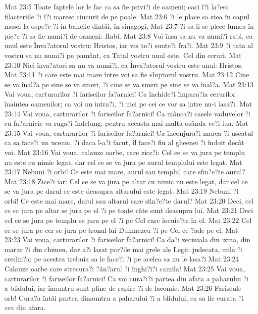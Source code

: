 Mat 23:5  Toate faptele lor le fac ca sa fie privi?i de oameni; caci î?i la?esc filacteriile ?i î?i maresc ciucurii de pe poale.
Mat 23:6  ?i le place sa stea în capul mesei la ospe?e ?i în bancile dintâi, în sinagogi,
Mat 23:7  ?i sa li se plece lumea în pie?e ?i sa fie numi?i de oameni: Rabi.
Mat 23:8  Voi însa sa nu va numi?i rabi, ca unul este Înva?atorul vostru: Hristos, iar voi to?i sunte?i fra?i.
Mat 23:9  ?i tata al vostru sa nu numi?i pe pamânt, ca Tatal vostru unul este, Cel din ceruri.
Mat 23:10  Nici înva?atori sa nu va numi?i, ca Înva?atorul vostru este unul: Hristos.
Mat 23:11  ?i care este mai mare între voi sa fie slujitorul vostru.
Mat 23:12  Cine se va înal?a pe sine se va smeri, ?i cine se va smeri pe sine se va înal?a.
Mat 23:13  Vai voua, carturarilor ?i fariseilor fa?arnici! Ca închide?i împara?ia cerurilor înaintea oamenilor; ca voi nu intra?i, ?i nici pe cei ce vor sa intre nu-i lasa?i.
Mat 23:14  Vai voua, carturarilor ?i fariseilor fa?arnici! Ca mânca?i casele vaduvelor ?i cu fa?arnicie va ruga?i îndelung; pentru aceasta mai multa osânda ve?i lua.
Mat 23:15  Vai voua, carturarilor ?i fariseilor fa?arnici! Ca înconjura?i marea ?i uscatul ca sa face?i un ucenic, ?i daca l-a?i facut, îl face?i fiu al gheenei ?i îndoit decât voi.
Mat 23:16  Vai voua, calauze oarbe, care zice?i: Cel ce se va jura pe templu nu este cu nimic legat, dar cel ce se va jura pe aurul templului este legat.
Mat 23:17  Nebuni ?i orbi! Ce este mai mare, aurul sau templul care sfin?e?te aurul?
Mat 23:18  Zice?i iar: Cel ce se va jura pe altar cu nimic nu este legat, dar cel ce se va jura pe darul ce este deasupra altarului este legat.
Mat 23:19  Nebuni ?i orbi! Ce este mai mare, darul sau altarul care sfin?e?te darul?
Mat 23:20  Deci, cel ce se jura pe altar se jura pe el ?i pe toate câte sunt deasupra lui.
Mat 23:21  Deci cel ce se jura pe templu se jura pe el ?i pe Cel care locuie?te în el.
Mat 23:22  Cel ce se jura pe cer se jura pe tronul lui Dumnezeu ?i pe Cel ce ?ade pe el.
Mat 23:23  Vai voua, carturarilor ?i fariseilor fa?arnici! Ca da?i zeciuiala din izma, din marar ?i din chimen, dar a?i lasat par?ile mai grele ale Legii: judecata, mila ?i credin?a; pe acestea trebuia sa le face?i ?i pe acelea sa nu le lasa?i
Mat 23:24  Calauze oarbe care strecura?i ?ân?arul ?i înghi?i?i camila!
Mat 23:25  Vai voua, carturarilor ?i fariseilor fa?arnici! Ca voi cura?i?i partea din afara a paharului ?i a blidului, iar înauntru sunt pline de rapire ?i de lacomie.
Mat 23:26  Fariseule orb! Cura?a întâi partea dinauntru a paharului ?i a blidului, ca sa fie curata ?i cea din afara.
